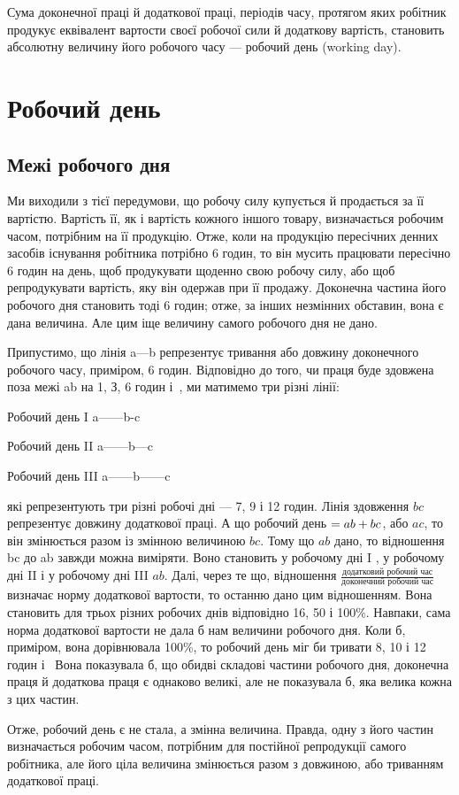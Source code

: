 
Сума доконечної праці й додаткової праці, періодів часу,
протягом яких робітник продукує еквівалент вартости своєї робочої
сили й додаткову вартість, становить абсолютну величину
його робочого часу — робочий день (working day).

\section{Робочий день}
\subsection{Межі робочого дня}

Ми виходили з тієї передумови, що робочу силу купується
й продається за її вартістю. Вартість її, як і вартість кожного
іншого товару, визначається робочим часом, потрібним на
її продукцію. Отже, коли на продукцію пересічних денних засобів
існування робітника потрібно 6 годин, то він мусить працювати
пересічно 6 годин на день, щоб продукувати щоденно свою робочу
силу, або щоб репродукувати вартість, яку він одержав при її
продажу. Доконечна частина його робочого дня становить тоді
6 годин; отже, за інших незмінних обставин, вона є дана величина.
Але цим іще величину самого робочого дня не дано.

Припустимо, що лінія a---b репрезентує тривання
або довжину доконечного робочого часу, приміром, 6 годин. Відповідно
до того, чи праця буде здовжена поза межі ab на 1, З,
6 годин і~, ми матимемо три різні лінії:

Робочий день I
a------b-c

Робочий день II
a------b---c

Робочий день III
a------b------c

\noindent{} які репрезентують три різні робочі дні — 7, 9 і 12 годин. Лінія
здовження $bc$ репрезентує довжину додаткової праці. А що робочий
день $= ab \dplus{} bc$, або $ac$, то він змінюється разом із змінною
величиною $bc$. Тому що $ab$ дано, то відношення bc до ab завжди
можна виміряти. Воно становить у робочому дні I , у робочому
дні II  і у робочому дні III  $ab$. Далі, через те що, відношення
$\frac{\text{додатковий робочий час}}{\text{доконечний робочий час}}$ визначає норму додаткової вартости, то
останню дано цим відношенням. Вона становить для трьох різних
робочих днів відповідно 16, 50 і 100\%. Навпаки, сама норма
додаткової вартости не дала б нам величини робочого дня. Коли
б, приміром, вона дорівнювала 100\%, то робочий день міг би
тривати 8, 10 і 12 годин і~ Вона показувала б, що обидві
складові частини робочого дня, доконечна праця й додаткова
праця є однаково великі, але не показувала б, яка велика кожна
з цих частин.

Отже, робочий день є не стала, а змінна величина. Правда,
одну з його частин визначається робочим часом, потрібним для
постійної репродукції самого робітника, але його ціла величина
змінюється разом з довжиною, або триванням додаткової праці.
\parbreak{}  %
